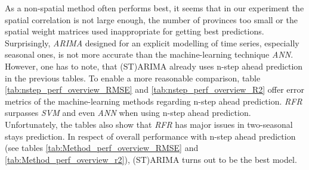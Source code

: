 \documentclass[a4paper,reqno,]{article}
\begin{document}
\newpage
\noindent
As a non-spatial method often performs best, it seems that in our experiment the spatial correlation is not large enough, the number of provinces too small or the spatial weight matrices used inappropriate for getting best predictions. Surprisingly, \textit{ARIMA} designed for an explicit modelling of time series, especially seasonal ones, is not more accurate than the machine-learning technique \textit{ANN}. However, one has to note, that (ST)ARIMA already uses n-step ahead prediction in the previous tables. To enable a more reasonable comparison, table \ref{tab:nstep_perf_overview_RMSE} and \ref{tab:nstep_perf_overview_R2} offer error metrics of the machine-learning methods regarding n-step ahead prediction. \textit{RFR} surpasses \textit{SVM} and even \textit{ANN} when using n-step ahead prediction. Unfortunately, the tables also show that \textit{RFR} has major issues in two-seasonal stays prediction. In respect of overall performance with n-step ahead prediction (see tables \ref{tab:Method_perf_overview_RMSE} and \ref{tab:Method_perf_overview_r2}), (ST)ARIMA turns out to be the best model.  
\\
\end{document}
